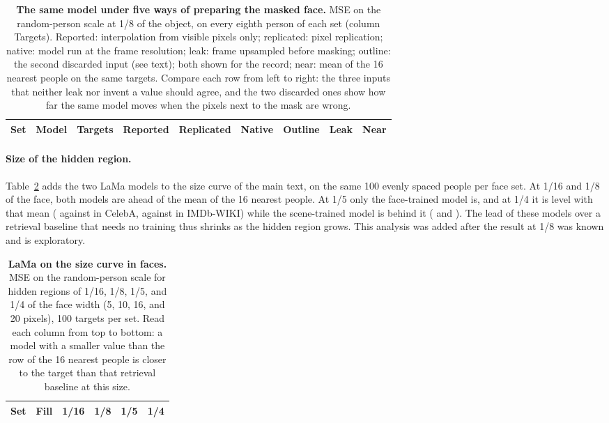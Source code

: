 \begin{table}[htbp]
\centering
\caption{\textbf{The same model under five ways of preparing the masked face.}
\acs{MSE} on the random-person scale at 1/8 of the object, on every eighth person of each set (column Targets).
Reported: interpolation from visible pixels only; replicated: pixel replication; native: model run at the frame resolution; leak: frame upsampled before masking; outline: the second discarded input (see text); both shown for the record; near: mean of the 16 nearest people on the same targets.
Compare each row from left to right: the three inputs that neither leak nor invent a value should agree, and the two discarded ones show how far the same model moves when the pixels next to the mask are wrong.}
\label{tab:s-input}
\small
\setlength{\tabcolsep}{4pt}
\begin{tabular}{@{}llrrrrrrr@{}}
\toprule
Set & Model & Targets & Reported & Replicated & Native & Outline & Leak & Near \\
\midrule
\end{tabular}
\end{table}

\paragraph{Size of the hidden region.}
Table~\ref{tab:s-size} adds the two LaMa models to the size curve of the main text, on the same 100 evenly spaced people per face set.
At 1/16 and 1/8 of the face, both models are ahead of the mean of the 16 nearest people.
At 1/5 only the face-trained model is, and at 1/4 it is level with that mean (\mfSizeLamaHqCelebaTwenty{} against \mfSizeRefNearestCelebaTwenty{} in CelebA, \mfSizeLamaHqImdbTwenty{} against \mfSizeRefNearestImdbTwenty{} in IMDb-WIKI) while the scene-trained model is behind it (\mfSizeLamaPlacesCelebaTwenty{} and \mfSizeLamaPlacesImdbTwenty{}).
The lead of these models over a retrieval baseline that needs no training thus shrinks as the hidden region grows.
This analysis was added after the result at 1/8 was known and is exploratory.

\begin{table}[htbp]
\centering
\caption{\textbf{LaMa on the size curve in faces.}
\acs{MSE} on the random-person scale for hidden regions of 1/16, 1/8, 1/5, and 1/4 of the face width (5, 10, 16, and 20 pixels), 100 targets per set.
Read each column from top to bottom: a model with a smaller value than the row of the 16 nearest people is closer to the target than that retrieval baseline at this size.}
\label{tab:s-size}
\small
\begin{tabular}{@{}llrrrr@{}}
\toprule
Set & Fill & 1/16 & 1/8 & 1/5 & 1/4 \\
\midrule
\end{tabular}
\end{table}


